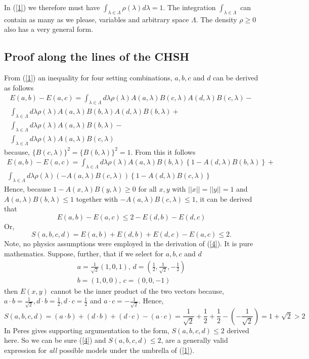 \documentclass{appolb}
\begin{document}
In (\ref{1}) we therefore must have  $\int_{\lambda \in \Lambda} \rho(\lambda) d\lambda =1$. The integration $\int_{\lambda \in \Lambda}$ can contain as many as we please, variables and arbitrary space $\Lambda$. The density $\rho \geq 0$ also has a very general form. 
\subsection{Proof along the lines of the CHSH}
From  (\ref{1}) an inequality for four setting combinations, $a,b,c$ and $d$ can be derived as follows
\begin{eqnarray}\label{2}
E(a,b)-E(a,c)=
\int_{\lambda \in \Lambda} d\lambda \rho(\lambda)  A(a,\lambda)B(c,\lambda)A(d,\lambda)B(c,\lambda)
-\nonumber\\
\int_{\lambda \in \Lambda} d\lambda \rho(\lambda)  A(a,\lambda)B(b,\lambda)A(d,\lambda)B(b,\lambda) 
+\nonumber \\ 
\int_{\lambda \in \Lambda}d \lambda \rho(\lambda)A(a,\lambda)B(b,\lambda)
-\nonumber\\
\int_{\lambda \in \Lambda}d \lambda \rho(\lambda)A(a,\lambda)B(c,\lambda)
\end{eqnarray}
because, $\{B(c,\lambda)\}^2=\{B(b,\lambda)\}^2=1$. From this it follows
\begin{eqnarray}\label{3}
E(a,b)-E(a,c)=\int_{\lambda \in \Lambda} d\lambda \rho(\lambda)A(a,\lambda)B(b,\lambda)\left\{ 1- A(d,\lambda)B(b,\lambda)\right\}+\nonumber \\
\int_{\lambda \in \Lambda} d\lambda \rho(\lambda)\left(-A(a,\lambda)B(c,\lambda) \right)\left\{ 1- A(d,\lambda)B(c,\lambda)\right\}
\end{eqnarray}
Hence, because $1-A(x,\lambda)B(y,\lambda) \geq 0$ for all $x,y$ with $||x||=||y||=1$ and $A(a,\lambda)B(b,\lambda) \leq 1$ together with $-A(a,\lambda)B(c,\lambda)\leq 1$, it can be derived that
\begin{equation}\label{4}
E(a,b)-E(a,c)\leq 2 - E(d,b)-E(d,c) 
\end{equation}
Or,
\begin{equation}\label{4a}
S(a,b,c,d)=E(a,b)+E(d,b)+E(d,c)-E(a,c) \leq 2.
\end{equation}
Note, no physics assumptions were employed in the derivation of (\ref{4}). It is pure mathematics.  
Suppose, further, that if we select for $a,b,c$ and $d$
\begin{eqnarray}\label{5}
a=\frac{1}{\sqrt{2}}\left(1,0,1\right),\,d=\left(\frac{1}{2},\frac{1}{\sqrt{2}},-\frac{1}{2}\right)\nonumber \\
b=\left(1,0,0\right),\, c=\left(0,0,-1\right)
\end{eqnarray}
then $E(x,y)$ cannot be the inner product of the two vectors because, $a\cdot b= \frac{1}{\sqrt{2}}, d\cdot b= \frac{1}{2}, d\cdot c= \frac{1}{2} $ and $a\cdot c = -\frac{1}{\sqrt{2}}$.  Hence, 
\[ S(a,b,c,d)=(a\cdot b)+ (d\cdot b) + (d\cdot c) -(a\cdot c) =\frac{1}{\sqrt{2}}+\frac{1}{2}+\frac{1}{2}-\left(-\frac{1}{\sqrt{2}}\right) =1+\sqrt{2}>2 
\]
In \cite{4} Peres gives supporting argumentation to the form, $S(a,b,c,d)\leq 2$  derived here. So we can be sure (\ref{4}) and $S(a,b,c,d)\leq 2$, are a generally valid expression for {\it all} possible models under the umbrella of (\ref{1}).
\end{document}
